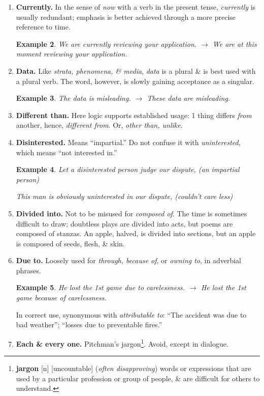 \documentclass[oneside]{book}
\numberwithin{equation}{section}
\newtheorem{example}{Example}[chapter]
\begin{document}
\begin{enumerate}
	\begin{example}
		I knew they'd cope. (jocular\footnote{\textbf{jocular} [a] (\textit{formal}) \textbf{1.} humorous; \textbf{2.} (of a person) enjoying making people laugh, \textsc{synonym}: \textbf{jolly}.}) $\to$ I knew they would cope with the situation.
	\end{example}
	\item \textbf{Currently.} In the sense of \textit{now} with a verb in the present tense, \textit{currently} is usually redundant; emphasis is better achieved through a more precise reference to time.
	
	\begin{example}
		We are currently reviewing your application. $\to$ We are at this moment reviewing your application.
	\end{example}
	\item \textbf{Data.} Like \textit{strata, phenomena, \& media}, \textit{data} is a plural \& is best used with a plural verb. The word, however, is slowly gaining acceptance as a singular.
	
	\begin{example}
		The data is misleading. $\to$ These data are misleading.
	\end{example}
	\item \textbf{Different than.} Here logic supports established usage: 1 thing differs \textit{from} another, hence, \textit{different from}. Or, \textit{other than, unlike}.
	\item \textbf{Disinterested.} Means ``impartial.'' Do not confuse it with \textit{uninterested}, which means ``not interested in.''
	
	\begin{example}
		Let a disinterested person judge our dispute, (an impartial person)
		
		This man is obviously uninterested in our dispute, (couldn't care less)
	\end{example}
	\item \textbf{Divided into.} Not to be misused for \textit{composed of}. The time is sometimes difficult to draw; doubtless plays are divided into acts, but poems are composed of stanzas. An apple, halved, is divided into sections, but an apple is composed of seeds, flesh, \& skin.
	\item \textbf{Due to.} Loosely used for \textit{through, because of}, or \textit{owning to}, in adverbial phrases.
	
	\begin{example}
		He lost the 1st game due to carelessness. $\to$ He lost the 1st game because of carelessness.
	\end{example}
	In correct use, synonymous with \textit{attributable to}: ``The accident was due to bad weather''; ``losses due to preventable fires.''
	\item \textbf{Each \& every one.} Pitchman's jargon\footnote{\textbf{jargon} [n] [uncountable] (\textit{often disapproving}) words or expressions that are used by a particular profession or group of people, \& are difficult for others to understand.}. Avoid, except in dialogue.
	

\end{enumerate}
\end{document}
